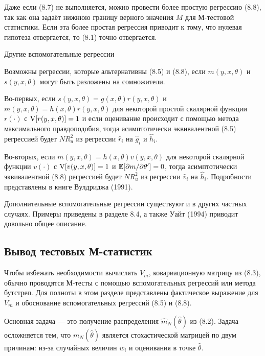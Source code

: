 Даже если (8.7) не выполняется, можно провести более простую регрессию (8.8), так как она задаёт нижнюю границу верного значения $M$ для М-тестовой статистики. Если эта более простая регрессия приводит к тому, что нулевая гипотеза отвергается, то (8.1) точно отвергается.

\begin{center}
Другие вспомогательные регрессии
\end{center}

Возможны регрессии, которые альтернативны (8.5) и (8.8), если $m(y, x, \theta)$ и $s(y, x, \theta)$ могут быть разложены на сомножители.

Во-первых, если $s(y, x, \theta) = g(x, \theta)r(y, x, \theta)$ и $m(y, x, \theta) = h(x, \theta)r(y, x, \theta)$ для некоторой простой скалярной функции $r(\cdot)$ с $\mathrm{V}[r(y, x, \theta)] = 1$ и если оценивание происходит с помощью метода максимального правдоподобия, тогда асимптотически эквивалентной (8.5) регрессией будет $NR_u^2$ из регрессии $\hat{r}_i$ на $\hat{g}_i$ и $\hat{h}_i$.

Во-вторых, если $m(y, x, \theta) = h(x, \theta)v(y, x, \theta)$ для некоторой скалярной функции $v(\cdot)$ с $\mathrm{V}[v(y, x, \theta)] = 1$ и $\mathbb{E}[\partial{m}/\partial{\theta}'] = 0$, тогда асимптотически эквивалентной (8.8) регрессией будет $NR_u^2$ из регрессии $\hat{v}_i$ на $\hat{h}_i$. Подробности представлены в книге Вулдриджа (1991).

Дополнительные вспомогательные регрессии существуют и в других частных случаях. Примеры приведены в разделе 8.4, а также Уайт (1994) приводит довольно общее описание.

\subsection{Вывод тестовых М-статистик}

Чтобы избежать необходимости вычислять $V_m$, ковариационную матрицу из (8.3), обычно проводятся М-тесты с помощью вспомогательных регрессий или метода бутстреп. Для полноты в этом разделе представлены фактическое выражение для $V_m$ и обоснование вспомогательных регрессий (8.5) и (8.8).

Основная задача --- это получение распределения $\hat{m}_N(\hat{\theta})$ из (8.2). Задача осложняется тем, что $m_N(\hat{\theta})$ является стохастической матрицей по двум причинам: из-за случайных величин $w_i$ и оценивания в точке $\hat{\theta}$.

